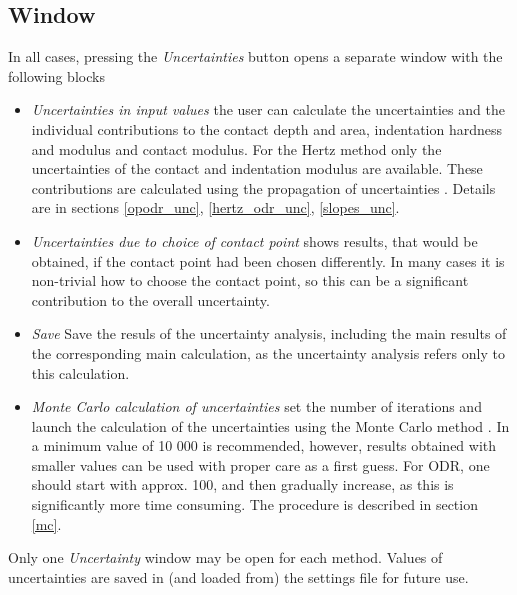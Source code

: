 \subsection{Window}
In all cases, pressing the \emph{Uncertainties} button opens a separate window with the following blocks
\begin{itemize}
 \item \emph{Uncertainties in input values} the user can calculate the uncertainties and the individual contributions to the contact depth and area, indentation hardness and modulus and contact modulus. 
          For the Hertz method only the uncertainties of the  contact and indentation modulus are available. 
          These contributions are calculated using the propagation of uncertainties \cite{GUM}. Details are in sections 
          \ref{opodr_unc}, 
          \ref{hertz_odr_unc},
          \ref{slopes_unc}.
 \item \emph{Uncertainties due to choice of contact point} shows results, that would be obtained, if the contact point had been chosen differently. 
          In many cases it is non-trivial how to choose the contact point, so this can be a significant contribution to the overall uncertainty.
 \item \emph{Save} Save the resuls of the uncertainty analysis, including the main results of the corresponding main calculation, as the uncertainty analysis refers only to this calculation.
 \item \emph{Monte Carlo calculation of uncertainties} set the number of iterations and launch the calculation of the uncertainties using the Monte Carlo method \cite{GUMSupplement1, GUMSupplement2}. 
            In \cite{GUMSupplement1, GUMSupplement2} a minimum value of 10 000 is recommended, however, results obtained with smaller values can be used with proper care as a first guess. 
            For ODR, one should start with approx. 100, and then gradually increase, as this is significantly more time consuming. The procedure is described in section \ref{mc}.
\end{itemize}
Only one \emph{Uncertainty} window may be open for each method. Values of uncertainties are saved in (and loaded from) the settings file for future use.


